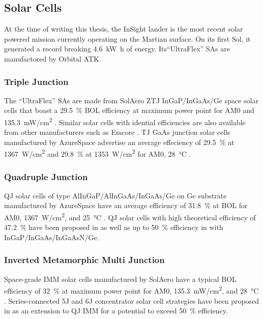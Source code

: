 \subsection{Solar Cells}
At the time of writing this thesis, the InSight lander is the most recent solar powered mission currently operating on the Martian surface. On its first Sol, it generated a record breaking \SI{4.6}{\kilo\watt\hour} of energy. Its``UltraFlex'' \acp{SA} are manufactored by Orbital ATK.

\subsubsection{Triple Junction}
The ``UltraFlex'' \acp{SA} are made from SolAero \ac{ZTJ} \ac{InGaP}/\ac{InGaAs}/\ac{Ge} space solar cells that boast a \SI{29.5}{\percent} \ac{BOL} efficiency at maximum power point for \ac{AM0} and \SI{135.3}{\milli\watt/\centi\meter^{2}} . Similar solar cells with idential efficiencies are also available from other manufacturers such as Emcore . \ac{TJ} \ac{GaAs} junction solar cells manufactured by AzureSpace advertise an average effeciency of \SI{29.5}{\percent} at \SI{1367}{\watt/\centi\meter^{2}} and \SI{29.8}{\percent} at \SI{1353}{\watt/\centi\meter^{2}} for \ac{AM0}, \SI{28}{\celsius} .

\subsubsection{Quadruple Junction}
\ac{QJ} solar cells of type \ac{AlInGaP}/\ac{AlInGaAs}/\ac{InGaAs}/\ac{Ge} on \ac{Ge} substrate manufactured by AzureSpace have an average efficiency of \SI{31.8}{\percent} at \ac{BOL} for \ac{AM0}, \SI{1367}{\watt/\centi\meter^{2}}, and \SI{25}{\celsius} . \ac{QJ} solar cells with high theoretical efficiency of \SI{47.2}{\percent} have been proposed in  as well as up to \SI{50}{\percent} efficiency in  with \ac{InGaP}/\ac{InGaAs}/\ac{InGaAsN}/\ac{Ge}.

\subsubsection{Inverted Metamorphic Multi Junction}
Space-grade \ac{IMM} solar cells manufactured by SolAero have a typical \ac{BOL} efficiency of \SI{32}{\percent} at maximum power point for \ac{AM0}, \SI{135.3}{\milli\watt/\centi\meter^{2}}, and \SI{28}{\celsius} . Series-connected \ac{5J} and \ac{6J} concentrator solar cell strategies have been proposed in  as an extension to \ac{QJ} \ac{IMM} for a potential to exceed \SI{50}{\percent} efficiency.

